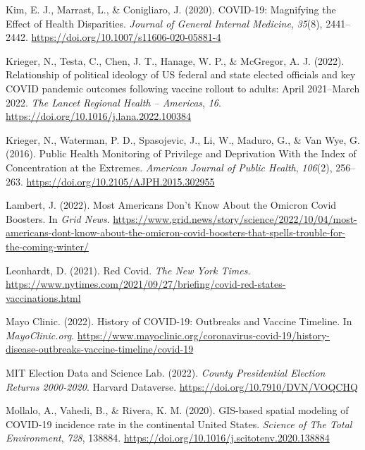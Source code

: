 \documentclass[
]{article}
\newlength{\cslhangindent}
\newlength{\cslentryspacingunit} %
\newenvironment{CSLReferences}[2] %
 {%
  \setlength{\parindent}{0pt}
  \ifodd #1
  \let\oldpar\par
  \def\par{\hangindent=\cslhangindent\oldpar}
  \fi
  \setlength{\parskip}{#2\cslentryspacingunit}
 }%
 {}
\begin{document}
\begin{CSLReferences}{1}{0}
\leavevmode{}%
Kim, E. J., Marrast, L., \& Conigliaro, J. (2020). {COVID}-19: {Magnifying} the {Effect} of {Health} {Disparities}. \emph{Journal of General Internal Medicine}, \emph{35}(8), 2441--2442. \url{https://doi.org/10.1007/s11606-020-05881-4}

\leavevmode{}%
Krieger, N., Testa, C., Chen, J. T., Hanage, W. P., \& McGregor, A. J. (2022). Relationship of political ideology of {US} federal and state elected officials and key {COVID} pandemic outcomes following vaccine rollout to adults: {April} 2021--{March} 2022. \emph{The Lancet Regional Health -- Americas}, \emph{16}. \url{https://doi.org/10.1016/j.lana.2022.100384}

\leavevmode{}%
Krieger, N., Waterman, P. D., Spasojevic, J., Li, W., Maduro, G., \& Van Wye, G. (2016). Public {Health} {Monitoring} of {Privilege} and {Deprivation} {With} the {Index} of {Concentration} at the {Extremes}. \emph{American Journal of Public Health}, \emph{106}(2), 256--263. \url{https://doi.org/10.2105/AJPH.2015.302955}

\leavevmode{}%
Lambert, J. (2022). Most {Americans} {Don}'t {Know} {About} the {Omicron} {Covid} {Boosters}. In \emph{Grid News}. \url{https://www.grid.news/story/science/2022/10/04/most-americans-dont-know-about-the-omicron-covid-boosters-that-spells-trouble-for-the-coming-winter/}

\leavevmode{}%
Leonhardt, D. (2021). Red {Covid}. \emph{The New York Times}. \url{https://www.nytimes.com/2021/09/27/briefing/covid-red-states-vaccinations.html}

\leavevmode{}%
Mayo Clinic. (2022). History of {COVID}-19: {Outbreaks} and {Vaccine} {Timeline}. In \emph{MayoClinic.org}. \url{https://www.mayoclinic.org/coronavirus-covid-19/history-disease-outbreaks-vaccine-timeline/covid-19}

\leavevmode{}%
MIT Election Data and Science Lab. (2022). \emph{County {Presidential} {Election} {Returns} 2000-2020}. Harvard Dataverse. \url{https://doi.org/10.7910/DVN/VOQCHQ}

\leavevmode{}%
Mollalo, A., Vahedi, B., \& Rivera, K. M. (2020). {GIS}-based spatial modeling of {COVID}-19 incidence rate in the continental {United} {States}. \emph{Science of The Total Environment}, \emph{728}, 138884. \url{https://doi.org/10.1016/j.scitotenv.2020.138884}


\end{CSLReferences}
\end{document}
